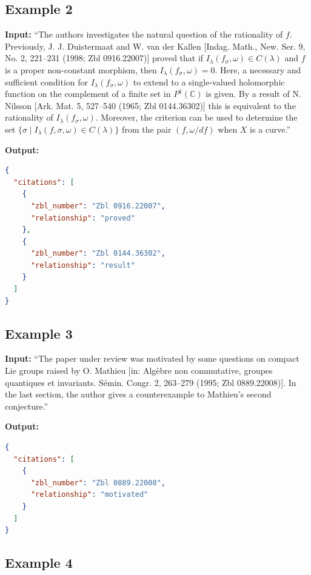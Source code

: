 \documentclass[sigconf,anonymous]{acmart}
\begin{document}
\subsection*{Example 2}

\textbf{Input:} ``The authors investigates the natural question of the rationality of $f$. Previously, J. J. Duistermaat and W. van der Kallen [Indag. Math., New. Ser. 9, No. 2, 221–231 (1998; Zbl 0916.22007)] proved that if $I_\lambda(f_\sigma,\omega)\in C(\lambda)$ and $f$ is a proper non-constant morphism, then $I_\lambda(f_\sigma,\omega)=0$. Here, a necessary and sufficient condition for $I_\lambda(f_\sigma,\omega)$ to extend to a single-valued holomorphic function on the complement of a finite set in $P^1(\mathbb{C})$ is given. By a result of N. Nilsson [Ark. Mat. 5, 527–540 (1965; Zbl 0144.36302)] this is equivalent to the rationality of $I_\lambda(f_\sigma,\omega)$. Moreover, the criterion can be used to determine the set $\{\sigma\mid I_\lambda(f,\sigma,\omega)\in C(\lambda)\}$ from the pair $(f,\omega/df)$ when $X$ is a curve.''

\textbf{Output:}
\begin{lstlisting}[language=json]
{
  "citations": [
    {
      "zbl_number": "Zbl 0916.22007",
      "relationship": "proved"
    },
    {
      "zbl_number": "Zbl 0144.36302",
      "relationship": "result"
    }
  ]
}
\end{lstlisting}

\subsection*{Example 3}

\textbf{Input:} ``The paper under review was motivated by some questions on compact Lie groups raised by O. Mathieu [in: Algèbre non commutative, groupes quantiques et invariants. Sémin. Congr. 2, 263–279 (1995; Zbl 0889.22008)]. In the last section, the author gives a counterexample to Mathieu's second conjecture.''

\textbf{Output:}
\begin{lstlisting}[language=json]
{
  "citations": [
    {
      "zbl_number": "Zbl 0889.22008",
      "relationship": "motivated"
    }
  ]
}
\end{lstlisting}

\subsection*{Example 4}
\end{document}
